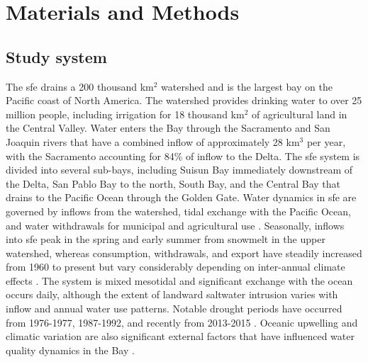 \documentclass[journal = esthag, manuscript = article]{achemso}\usepackage[]{graphicx}\usepackage[]{color}
\begin{document}
\section{Materials and Methods}

\subsection{Study system}

The \ac{sfe} drains a 200 thousand km$^2$ watershed and is the largest bay on the Pacific coast of North America.  The watershed provides drinking water to over 25 million people, including irrigation for 18 thousand km$^2$ of agricultural land in the Central Valley.  Water enters the Bay through the Sacramento and San Joaquin rivers that have a combined inflow of approximately 28 km$^3$ per year, with the Sacramento accounting for 84\% of inflow to the Delta.  The \ac{sfe} system is divided into several sub-bays, including Suisun Bay immediately downstream of the Delta, San Pablo Bay to the north, South Bay, and the Central Bay that drains to the Pacific Ocean through the Golden Gate.  Water dynamics in \ac{sfe} are governed by inflows from the watershed, tidal exchange with the Pacific Ocean, and water withdrawals for municipal and agricultural use \cite{Jassby00}.  Seasonally, inflows into \ac{sfe} peak in the spring and early summer from snowmelt in the upper watershed, whereas consumption, withdrawals, and export have steadily increased from 1960 to present but vary considerably depending on inter-annual climate effects \cite{Cloern12b}.  The system is mixed mesotidal and significant exchange with the ocean occurs daily, although the extent of landward saltwater intrusion varies with inflow and annual water use patterns. Notable drought periods have occurred from 1976-1977, 1987-1992, and recently from 2013-2015 \cite{Cloern15}.  Oceanic upwelling and climatic variation are also significant external factors that have influenced water quality dynamics in the Bay \cite{Cloern07}.
\end{document}
